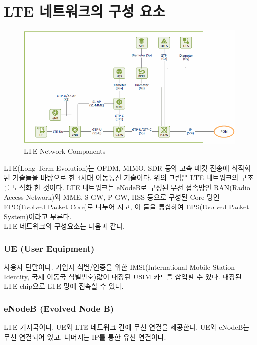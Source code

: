 \section{LTE 네트워크의 구성 요소}
\vspace{-4mm}  
\begin{figure}[!h]\centering
	\includegraphics[width=.7\textwidth]{image/week11/1-2.png}
	\caption{\small LTE Network Components}
	\vspace{-10pt}
\end{figure}
LTE(Long Term Evolution)는 OFDM, MIMO, SDR 등의 고속 패킷 전송에 최적화된 기술들을 바탕으로 한 4세대 이동통신 기술이다. 위의 그림은 LTE 네트워크의 구조를 도식화 한 것이다. LTE 네트워크는 eNodeB로 구성된 무선 접속망인 RAN(Radio Access Network)와 MME, S-GW, P-GW, HSS 등으로 구성된 Core 망인 EPC(Evolved Packet Core)로 나누어 지고, 이 둘을 통합하여 EPS(Evolved Packet System)이라고 부른다. \\
LTE 네트워크의 구성요소는 다음과 같다.

    \subsubsection*{UE (User Equipment)}
    사용자 단말이다. 가입자 식별/인증을 위한 IMSI(International Mobile Station Identity, 국제 이동국 식별번호)값이 내장된 USIM  카드를 삽입할 수 있다. 내장된 LTE chip으로 LTE 망에 접속할 수 있다.
\vspace{-2mm}
    \subsubsection*{eNodeB (Evolved Node B)}
    LTE 기지국이다. UE와 LTE 네트워크 간에 무선 연결을 제공한다. UE와 eNodeB는 무선 연결되어 있고, 나머지는 IP를 통한 유선 연결이다.
\vspace{-2mm}
